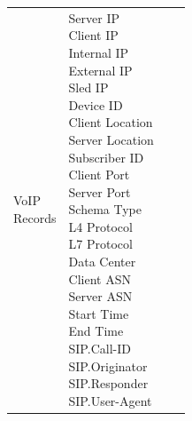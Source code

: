 \begin{description}
\begin{longtable}{p{}|p{}|p{}|p{}}
        \tabincell{l}{VoIP\\ Records} &   \tabincell{l}{Server IP\\
                                                            Client IP\\
                                                            Internal IP\\
                                                            External IP\\
                                                            Sled IP\\
                                                            Device ID\\
                                                            Client Location\\
                                                            Server Location\\
                                                            Subscriber ID\\
                                                            Client Port\\
                                                            Server Port\\
                                                            Schema Type\\
                                                            L4 Protocol\\
                                                            L7 Protocol\\
                                                            Data Center\\
                                                            Client ASN\\
                                                            Server ASN\\
                                                            Start Time\\
                                                            End Time\\
                                                            SIP.Call-ID\\
                                                            SIP.Originator\\
                                                            SIP.Responder\\
                                                            SIP.User-Agent\\
}
\end{longtable}
\end{description}
